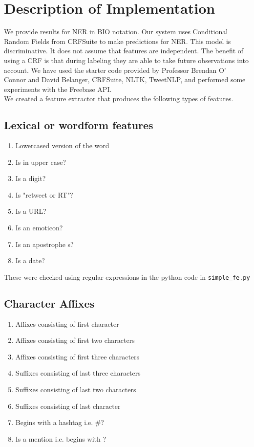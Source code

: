 \documentclass[a4paper]{article}
\begin{document}
\section{Description of Implementation}

We provide results for NER in BIO notation. Our system uses Conditional Random Fields from CRFSuite to make predictions for NER.  This model is discriminative. It does not assume that features are independent. The benefit of using a CRF is that  during labeling they are able to take future observations into account. We have used the starter code provided by Professor Brendan O' Connor and David Belanger, CRFSuite, NLTK, TweetNLP, and performed some experiments with the Freebase API.\\


We created a feature extractor that produces the following types of features. 


\subsection{Lexical or wordform features}
\begin{enumerate}
\item Lowercased version of the word
\item Is in upper case?
\item Is a digit?
\item Is "retweet or RT"?
\item Is a URL?
\item Is an emoticon?
\item Is an apostrophe s?
\item Is a date?
\end{enumerate}

These were checked using regular expressions in the python code in \texttt{simple\_fe.py}

\subsection{Character Affixes}
\begin{enumerate}
\item Affixes consisting of first character
\item Affixes consisting of first two characters
\item Affixes consisting of first three characters
\item Suffixes consisting of last three characters
\item Suffixes consisting of last two characters
\item Suffixes consisting of last character
\item Begins with a hashtag i.e. \#?
\item Is a mention i.e. begins with \@?
\end{enumerate}
\end{document}
